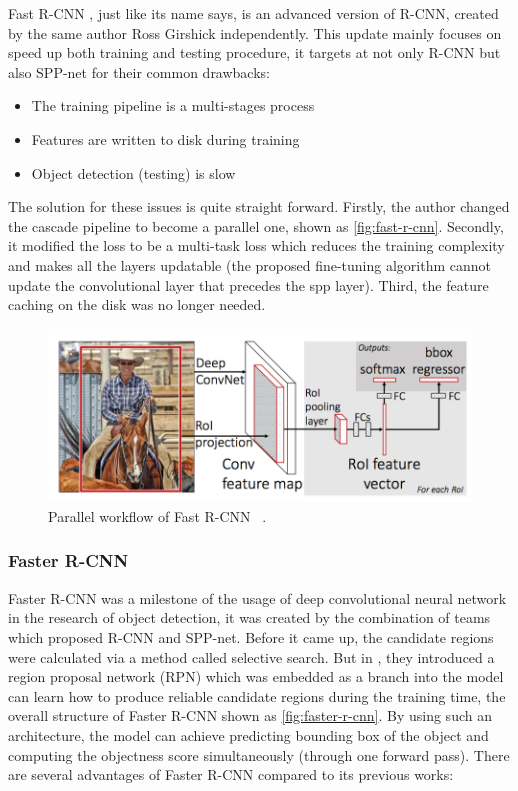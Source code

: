 Fast R-CNN \cite{fast-r-cnn-paper-2015}, just like its name says, is
an advanced version of R-CNN, created by the same
author Ross Girshick independently. This update mainly focuses on speed up both
training and testing procedure, it targets
at not only R-CNN but also SPP-net for their common drawbacks:

\begin{itemize}
    \item The training pipeline is a multi-stages process
    \item Features are written to disk during training
    \item Object detection (testing) is slow
\end{itemize}

The solution for these issues is quite straight forward. Firstly, the author
changed the cascade pipeline to become a
parallel one, shown as \autoref{fig:fast-r-cnn}. Secondly, it modified the loss
to be a multi-task loss which reduces the
training complexity and makes all the layers updatable (the proposed fine-tuning
algorithm cannot update the convolutional
layer that precedes the spp layer). Third, the feature caching on the disk was
no longer needed.

\begin{figure}
    \begin{center}
    \includegraphics[scale=0.7]{figures/fast_r_cnn.png}
    \end{center}
    \caption{Parallel workflow of Fast R-CNN
    ~\protect\cite{fast-r-cnn-paper-2015}.}
    \label{fig:fast-r-cnn}
\end{figure}


\subsubsection{Faster R-CNN}

Faster R-CNN was a milestone of the usage of deep convolutional neural network
in the research of
object detection, it was created by the combination of teams which proposed
R-CNN and SPP-net. Before it came up,
the candidate regions were calculated via a method called selective search. But
in \cite{faster-r-cnn-paper-2015},
they introduced a region proposal network (RPN) which was embedded as a branch
into the model can learn how to
produce reliable candidate regions during the training time, the overall
structure of Faster R-CNN shown
as \autoref{fig:faster-r-cnn}. By using such an architecture, the model can
achieve predicting bounding box of the object
and computing the objectness score simultaneously (through one forward pass).
There are several advantages of
Faster R-CNN compared to its previous works:

